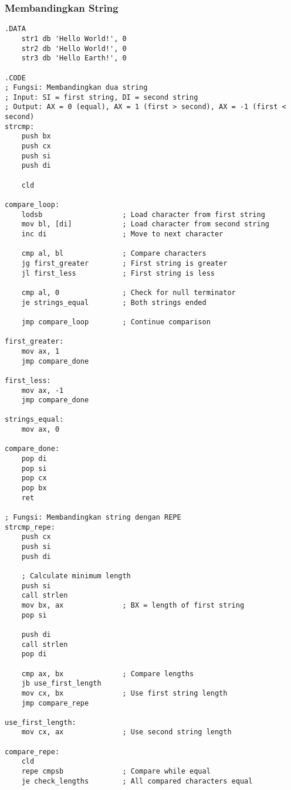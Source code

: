 \documentclass[../main.tex]{subfiles}
\begin{document}
            \subsubsection{Membandingkan String}
                \begin{lstlisting}[language={[x86masm]Assembler}, caption=Membandingkan String, label={lst:string-compare}]
.DATA
    str1 db 'Hello World!', 0
    str2 db 'Hello World!', 0
    str3 db 'Hello Earth!', 0

.CODE
; Fungsi: Membandingkan dua string
; Input: SI = first string, DI = second string
; Output: AX = 0 (equal), AX = 1 (first > second), AX = -1 (first < second)
strcmp:
    push bx
    push cx
    push si
    push di
    
    cld
    
compare_loop:
    lodsb                   ; Load character from first string
    mov bl, [di]            ; Load character from second string
    inc di                  ; Move to next character
    
    cmp al, bl              ; Compare characters
    jg first_greater        ; First string is greater
    jl first_less           ; First string is less
    
    cmp al, 0               ; Check for null terminator
    je strings_equal        ; Both strings ended
    
    jmp compare_loop        ; Continue comparison
    
first_greater:
    mov ax, 1
    jmp compare_done
    
first_less:
    mov ax, -1
    jmp compare_done
    
strings_equal:
    mov ax, 0
    
compare_done:
    pop di
    pop si
    pop cx
    pop bx
    ret

; Fungsi: Membandingkan string dengan REPE
strcmp_repe:
    push cx
    push si
    push di
    
    ; Calculate minimum length
    push si
    call strlen
    mov bx, ax              ; BX = length of first string
    pop si
    
    push di
    call strlen
    pop di
    
    cmp ax, bx              ; Compare lengths
    jb use_first_length
    mov cx, bx              ; Use first string length
    jmp compare_repe
    
use_first_length:
    mov cx, ax              ; Use second string length
    
compare_repe:
    cld
    repe cmpsb              ; Compare while equal
    je check_lengths        ; All compared characters equal
    

\end{lstlisting}
\end{document}
